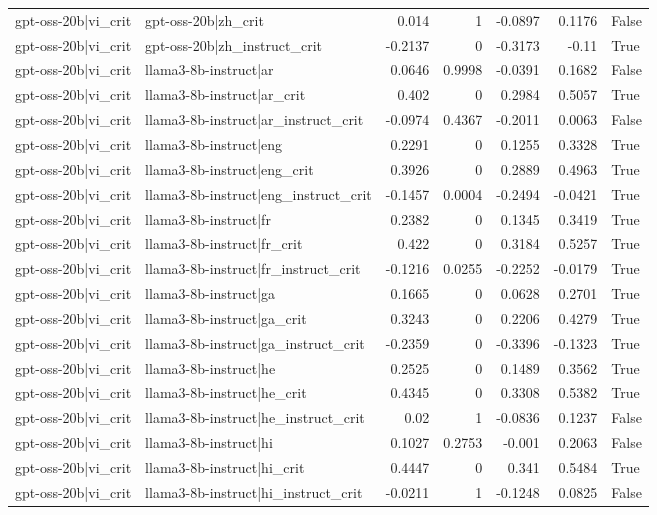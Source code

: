\begin{table}
\begin{tabular}{l l r r r r l}
gpt-oss-20b|vi_crit & gpt-oss-20b|zh_crit & 0.014 & 1 & -0.0897 & 0.1176 & False \\
gpt-oss-20b|vi_crit & gpt-oss-20b|zh_instruct_crit & -0.2137 & 0 & -0.3173 & -0.11 & True \\
gpt-oss-20b|vi_crit & llama3-8b-instruct|ar & 0.0646 & 0.9998 & -0.0391 & 0.1682 & False \\
gpt-oss-20b|vi_crit & llama3-8b-instruct|ar_crit & 0.402 & 0 & 0.2984 & 0.5057 & True \\
gpt-oss-20b|vi_crit & llama3-8b-instruct|ar_instruct_crit & -0.0974 & 0.4367 & -0.2011 & 0.0063 & False \\
gpt-oss-20b|vi_crit & llama3-8b-instruct|eng & 0.2291 & 0 & 0.1255 & 0.3328 & True \\
gpt-oss-20b|vi_crit & llama3-8b-instruct|eng_crit & 0.3926 & 0 & 0.2889 & 0.4963 & True \\
gpt-oss-20b|vi_crit & llama3-8b-instruct|eng_instruct_crit & -0.1457 & 0.0004 & -0.2494 & -0.0421 & True \\
gpt-oss-20b|vi_crit & llama3-8b-instruct|fr & 0.2382 & 0 & 0.1345 & 0.3419 & True \\
gpt-oss-20b|vi_crit & llama3-8b-instruct|fr_crit & 0.422 & 0 & 0.3184 & 0.5257 & True \\
gpt-oss-20b|vi_crit & llama3-8b-instruct|fr_instruct_crit & -0.1216 & 0.0255 & -0.2252 & -0.0179 & True \\
gpt-oss-20b|vi_crit & llama3-8b-instruct|ga & 0.1665 & 0 & 0.0628 & 0.2701 & True \\
gpt-oss-20b|vi_crit & llama3-8b-instruct|ga_crit & 0.3243 & 0 & 0.2206 & 0.4279 & True \\
gpt-oss-20b|vi_crit & llama3-8b-instruct|ga_instruct_crit & -0.2359 & 0 & -0.3396 & -0.1323 & True \\
gpt-oss-20b|vi_crit & llama3-8b-instruct|he & 0.2525 & 0 & 0.1489 & 0.3562 & True \\
gpt-oss-20b|vi_crit & llama3-8b-instruct|he_crit & 0.4345 & 0 & 0.3308 & 0.5382 & True \\
gpt-oss-20b|vi_crit & llama3-8b-instruct|he_instruct_crit & 0.02 & 1 & -0.0836 & 0.1237 & False \\
gpt-oss-20b|vi_crit & llama3-8b-instruct|hi & 0.1027 & 0.2753 & -0.001 & 0.2063 & False \\
gpt-oss-20b|vi_crit & llama3-8b-instruct|hi_crit & 0.4447 & 0 & 0.341 & 0.5484 & True \\
gpt-oss-20b|vi_crit & llama3-8b-instruct|hi_instruct_crit & -0.0211 & 1 & -0.1248 & 0.0825 & False \\

\end{tabular}
\end{table}
